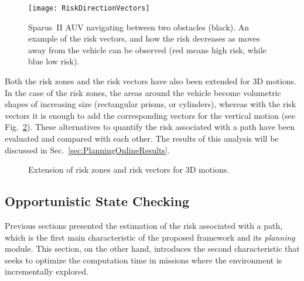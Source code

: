 \begin{figure}[htbp]
	\centering
	\texttt{[image: RiskDirectionVectors]} 
\caption[Sparus~II AUV navigating between two obstacles and a visual
representation of the risk vectors zones around the vehicle.]
{Sparus~II \ac{AUV} navigating between two obstacles (black). An example of the
risk vectors, and how the risk decreases as moves away from the vehicle can be
observed (red means high risk, while blue low risk).}
\label{fig:RiskDirectionVectors}
\end{figure}

Both the risk zones and the risk vectors have also been extended for \ac{3D}
motions. In the case of the risk zones, the areas around the vehicle become
volumetric shapes of increasing size (\eg rectangular prisms, or cylinders),
whereas with the risk vectors it is enough to add the corresponding vectors for
the vertical motion (see Fig.~\ref{fig:3DRiskZonesVectors}). These alternatives
to quantify the risk associated with a path have been evaluated and compared
with each other. The results of this analysis will be discussed in
Sec.~\ref{sec:PlanningOnlineResults}.

\begin{figure}[htbp]
\centering
     \quad
\caption[Extension of risk zones and risk vectors for 3D motions.]
{Extension of risk zones and risk vectors for 3D motions.}
\label{fig:3DRiskZonesVectors}
\end{figure}

\subsection{Opportunistic State Checking}
\label{sec:OportStateCheck}

Previous sections presented the estimation of the risk associated with a path,
which is the first main characteristic of the proposed framework and its
\textit{planning} module. This section, on the other hand, introduces the second
characteristic that seeks to optimize the computation time in missions where the
environment is incrementally explored.

